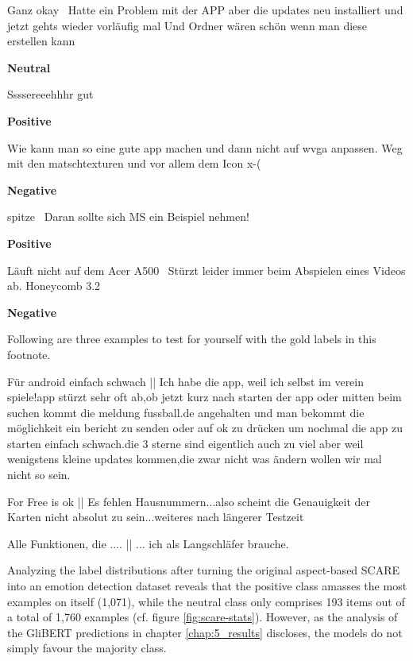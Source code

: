 \begin{examples}
  \item Ganz okay \textbar\textbar\ Hatte ein Problem mit der APP aber die updates neu installiert und jetzt gehts wieder vorläufig mal Und Ordner wären schön wenn man diese erstellen kann

        \textbf{Neutral}
  \item Ssssereeehhhr gut

        \textbf{Positive}
  \item Wie kann man so eine gute app machen und dann nicht auf wvga anpassen. Weg mit den matschtexturen und vor allem dem Icon x-(

        \textbf{Negative}
  \item spitze \textbar\textbar\ Daran sollte sich MS ein Beispiel nehmen!

        \textbf{Positive}
  \item Läuft nicht auf dem Acer A500 \textbar\textbar\ Stürzt leider immer beim Abspielen eines Videos ab. Honeycomb 3.2

        \textbf{Negative}
\end{examples}

Following are three examples to test for yourself with the gold labels in this
footnote.

\begin{examples}
  \item \label{itm:scare1} Für android einfach schwach || Ich habe die app, weil ich selbst im verein spiele!app stürzt sehr oft ab,ob jetzt kurz nach starten der app oder mitten beim suchen kommt die meldung fussball.de angehalten und man bekommt die möglichkeit ein bericht zu senden oder auf ok zu drücken um nochmal die app zu starten einfach schwach.die 3 sterne sind eigentlich auch zu viel aber weil wenigstens kleine updates kommen,die zwar nicht was ändern wollen wir mal nicht so sein.
  \item \label{itm:scare2} For Free is ok || Es fehlen Hausnummern...also scheint die Genauigkeit der Karten nicht absolut zu sein...weiteres nach längerer Testzeit
  \item \label{itm:scare3} Alle Funktionen, die .... || ... ich als Langschläfer brauche.
\end{examples}

Analyzing the label distributions after turning the original aspect-based SCARE into an emotion detection dataset
reveals that the positive class amasses the most examples on itself (1,071), while the neutral class only comprises
193 items out of a total of 1,760 examples (cf. figure \ref{fig:scare-stats}). However, as the analysis of the
GliBERT predictions in chapter \ref{chap:5_results} discloses, the models do not simply favour the majority class.

